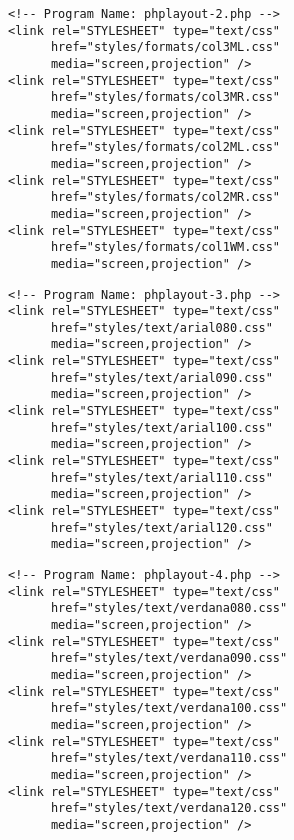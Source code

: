 \documentclass[12pt,a4paper,twosides,ngerman]{scrbook}
\begin{document}
\begin{center}
\begin{minipage}[t]{155mm}
\begin{lstlisting}[captionpos=b, caption=Layout - phplayout-2.php]
<!-- Program Name: phplayout-2.php -->
<link rel="STYLESHEET" type="text/css"
      href="styles/formats/col3ML.css"
      media="screen,projection" />
<link rel="STYLESHEET" type="text/css"
      href="styles/formats/col3MR.css"
      media="screen,projection" />
<link rel="STYLESHEET" type="text/css"
      href="styles/formats/col2ML.css"
      media="screen,projection" />
<link rel="STYLESHEET" type="text/css"
      href="styles/formats/col2MR.css"
      media="screen,projection" />
<link rel="STYLESHEET" type="text/css"
      href="styles/formats/col1WM.css"
      media="screen,projection" />
\end{lstlisting}
\end{minipage}
\end{center}       
 
\begin{center}
\begin{minipage}[t]{155mm}
\begin{lstlisting}[captionpos=b, caption=Layout - phplayout-3.php]
<!-- Program Name: phplayout-3.php -->
<link rel="STYLESHEET" type="text/css"
      href="styles/text/arial080.css"
      media="screen,projection" />
<link rel="STYLESHEET" type="text/css"
      href="styles/text/arial090.css"
      media="screen,projection" />
<link rel="STYLESHEET" type="text/css"
      href="styles/text/arial100.css"
      media="screen,projection" />
<link rel="STYLESHEET" type="text/css"
      href="styles/text/arial110.css"
      media="screen,projection" />
<link rel="STYLESHEET" type="text/css"
      href="styles/text/arial120.css"
      media="screen,projection" />
\end{lstlisting}
\end{minipage}
\end{center} 

\begin{center}
\begin{minipage}[t]{155mm}
\begin{lstlisting}[captionpos=b, caption=Layout - phplayout-4.php]
<!-- Program Name: phplayout-4.php -->
<link rel="STYLESHEET" type="text/css"
      href="styles/text/verdana080.css"
      media="screen,projection" />
<link rel="STYLESHEET" type="text/css"
      href="styles/text/verdana090.css"
      media="screen,projection" />
<link rel="STYLESHEET" type="text/css"
      href="styles/text/verdana100.css"
      media="screen,projection" />
<link rel="STYLESHEET" type="text/css"
      href="styles/text/verdana110.css"
      media="screen,projection" />
<link rel="STYLESHEET" type="text/css"
      href="styles/text/verdana120.css"
      media="screen,projection" />
\end{lstlisting}
\end{minipage}
\end{center} 
 
\end{document}
